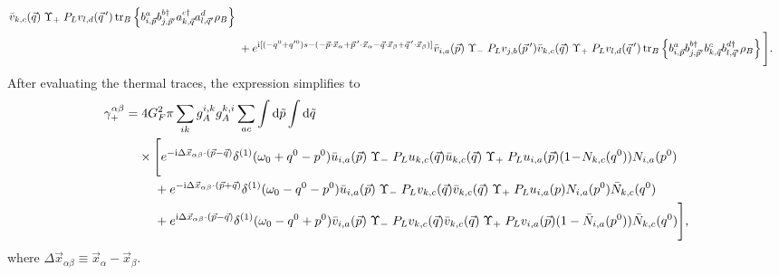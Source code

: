 \documentclass[aps,prd,10pt,twocolumn,superscriptaddress,floatfix,nofootinbib,amsmath,amssymb,altaffilletter,preprintnumbers]{revtex4-1}
\begin{document}
\begin{equation}
\begin{aligned}
    \bar{v}_{k,c}(\vec{q}) \; \Upsilon_+\;P_L v_{l,d}(\vec{q}\,') \, 
   \text{tr}_B\left\{ 
        b^{a}_{i,\vec{p}} b^{b \dag }_{j,\vec{p}'} 
    a^{c \dag}_{k,\vec{q}} a^{d }_{l,\vec{q}'} \rho_B 
    \right\} \\
    &\;  +e^{{\rm i}[(-q^0+q'^0)s-(-\vec{p}\cdot\vec{x}_\alpha + \vec{p}\,'\cdot\vec{x}_\alpha - \vec{q}\cdot\vec{x}_\beta + \vec{q}\,'\cdot\vec{x}_\beta)]}
    \bar{v}_{i,a}(\vec{p})\; \Upsilon_- \; P_L v_{j,b}(\vec{p}\,') 
    \bar{v}_{k,c}(\vec{q}) \; \Upsilon_+ \; P_L v_{l,d}(\vec{q}\,') \, \text{tr}_B\left\{ 
        b^{a}_{i,\vec{p}} b^{b \dag }_{j,\vec{p}'} 
    b^{c}_{k,\vec{q}} b^{d \dag }_{l,\vec{q}'} \rho_B 
    \right\} \Bigg].
\end{aligned}
\end{equation}
After evaluating the thermal traces, the expression simplifies to 
\begin{equation}
\begin{aligned}
\gamma^{\alpha \beta}_{+} =& \; 4 G_F^2\pi \sum_{ik} g_A^{i,k} g_A^{k,i} 
    \sum_{ac}  
    \int {\rm d}\tilde{p} \int {\rm d}\tilde{q}  \\
    &\times \Bigg[e^{-{\rm i}\Delta\vec{x}_{\alpha \beta}\cdot(\vec{p}-\vec{q})}\delta^{(1)}(\omega_0+q^0-p^0)
    \bar{u}_{i,a}(\vec{p}) \; \Upsilon_- \;P_L u_{k,c}(\vec{q}) 
    \bar{u}_{k,c}(\vec{q}) \; \Upsilon_+\;P_L u_{i,a}(\vec{p})(1\! -\!N_{k,c}(q^0)) N_{i,a}(p^0) \\
    & \quad\;  + e^{-{\rm i}\Delta\vec{x}_{\alpha \beta}\cdot(\vec{p}+\vec{q})} \delta^{(1)}(\omega_0-q^0-p^0)
    \bar{u}_{i,a}(\vec{p}) \; \Upsilon_- \;P_L v_{k,c}(\vec{q}) 
    \bar{v}_{k,c}(\vec{q}) \; \Upsilon_+\;P_L u_{i,a}(p)N_{i,a}(p^0)\bar{N}_{k,c}(q^0) \\
    &\quad \; +e^{{\rm i}\Delta\vec{x}_{\alpha \beta}\cdot(\vec{p}-\vec{q})} \delta^{(1)}(\omega_0-q^0+p^0)
    \bar{v}_{i,a}(\vec{p}) \; \Upsilon_- \;P_L v_{k,c}(\vec{q}) 
    \bar{v}_{k,c}(\vec{q}) \; \Upsilon_+\;P_L v_{i,a}(\vec{p}) (1- \bar{N}_{i,a}(p^0))\bar{N}_{k,c}(q^0)\Bigg],
    \label{coh}
\end{aligned}
\end{equation}
where $\Delta\vec{x}_{\alpha \beta} \equiv \vec{x}_{\alpha}-\vec{x}_{\beta}$.
\end{document}
